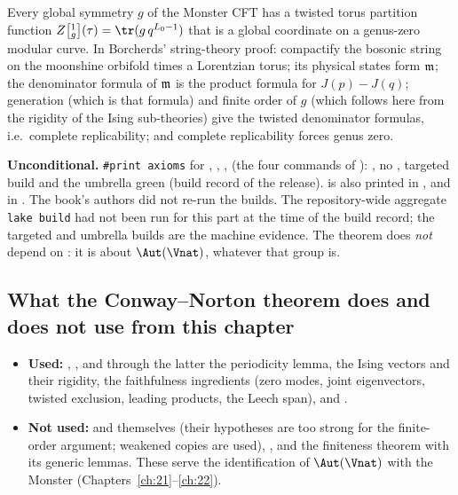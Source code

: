 \begin{physics}
Every global symmetry $g$ of the Monster CFT has a twisted torus partition function $Z\bigl[{}^{1}_{g}\bigr](\tau)=\tr(g\,q^{L_0-1})$
that is a global coordinate on a genus-zero modular curve.  In Borcherds' string-theory proof: compactify the bosonic
string on the moonshine orbifold times a Lorentzian torus; its physical states form $\mathfrak m$; the denominator formula of
$\mathfrak m$ is the product formula for $J(p)-J(q)$; generation (which is that formula) and finite order of $g$ (which follows
here from the rigidity of the Ising sub-theories) give the twisted denominator formulas, i.e.\ complete replicability; and
complete replicability forces genus zero.
\end{physics}
\begin{status}
\textbf{Unconditional.}  \texttt{\#print axioms} for , ,
,  (the four commands of
): , no ,
targeted build and the umbrella  green (build record of the release).
 is also printed in , and
 in .  The book's authors did not
re-run the builds.  The repository-wide aggregate \texttt{lake build} had not been run for this part at the time of the
build record; the targeted and umbrella builds are the machine evidence.  The theorem
does \emph{not} depend on : it is about $\Aut(\Vnat)$, whatever that group is.
\end{status}

\subsection{What the Conway--Norton theorem does and does not use from this chapter}

\begin{itemize}
\item \textbf{Used:} , , and through the latter the
  periodicity lemma, the Ising vectors and their rigidity, the faithfulness ingredients (zero modes, joint eigenvectors,
  twisted exclusion, leading products, the Leech span), and .
\item \textbf{Not used:}  and  themselves (their
  hypotheses are too strong for the finite-order argument; weakened copies are used), ,
  and the finiteness theorem  with its generic lemmas.  These serve the identification of $\Aut(\Vnat)$
  with the Monster (Chapters~\ref{ch:21}--\ref{ch:22}).
\end{itemize}

